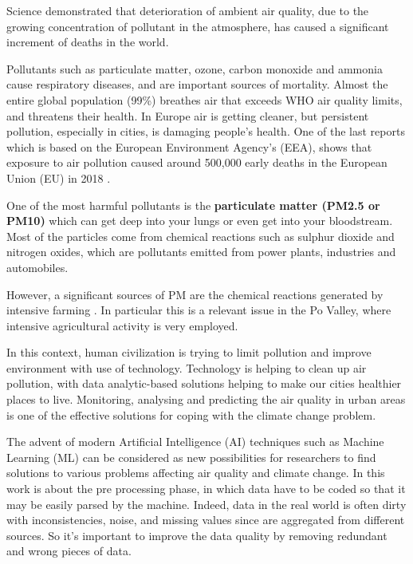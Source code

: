 Science demonstrated that deterioration of ambient air quality, due to the growing concentration of pollutant in the atmosphere, has caused a significant increment of deaths in the world.\par  
Pollutants such as particulate matter, ozone, carbon monoxide and ammonia cause respiratory diseases, and are important sources of mortality.
Almost the entire global population (99\%) breathes air that exceeds WHO air quality limits, and threatens their health.\newline
In Europe air is getting cleaner, but persistent pollution, especially in cities, is damaging people’s health. One of the last reports which is based on the European Environment Agency’s (EEA), shows that exposure to air pollution caused around 500,000 early deaths in the European Union (EU) in 2018 \cite{european2018air}.\par
One of the most harmful pollutants is the \textbf{particulate matter (PM2.5 or PM10)} which can get deep into your lungs or even get into your bloodstream.\newline
Most of the particles come from chemical reactions such as sulphur dioxide and nitrogen oxides, which are pollutants emitted from power plants, industries and automobiles.\par
However, a significant sources of PM are the chemical reactions generated by intensive farming \cite{burkart2007diffuse}.
In particular this is a relevant issue in the Po Valley, where intensive agricultural activity is very employed.\par
In this context, human civilization is trying to limit pollution and improve environment with use of technology.\newline
Technology is helping to clean up air pollution, with data analytic-based solutions helping to make our cities healthier places to live.\newline
Monitoring, analysing and predicting the air quality in urban areas is one of the effective solutions for coping with the climate change problem.\par
The advent of modern Artificial Intelligence (AI) techniques such as Machine Learning (ML) can be considered as new possibilities for researchers to find solutions to various problems affecting air quality and climate change.
\bigskip
In this work is about the pre processing phase, in which data have to be coded so that it may be easily parsed by the machine. 
Indeed, data in the real world is often dirty with inconsistencies, noise, and missing values since are aggregated from different sources. So it's important to improve the data quality by removing redundant and wrong pieces of data.
